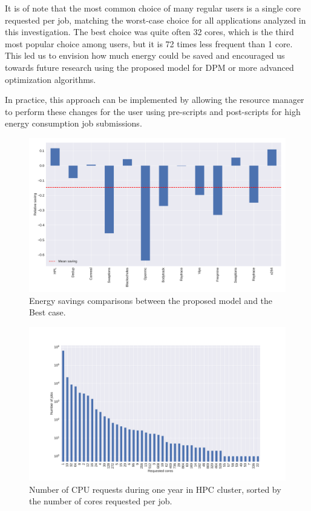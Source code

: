 It is of note that the most common choice of many regular users is a single core requested per job, matching the worst-case choice for all applications analyzed in this investigation. The best choice was quite often 32 cores, which is the third most popular choice among users, but it is 72 times less frequent than 1 core. This led us to envision how much energy could be saved and encouraged us towards future research using the proposed model for DPM or more advanced optimization algorithms.

In practice, this approach can be implemented by allowing the resource manager to perform these changes for the user using pre-scripts and post-scripts for high energy consumption job submissions.
\begin{figure}[H]
	\centering
	\includegraphics[width=\columnwidth]{models/figures/dvfs_cmp_32.pdf}
	\caption{Energy savings comparisons between the proposed model and the Best case.}
	\label{fig:energy_best_case}
\end{figure}
\vspace{-12pt}

\begin{figure}[H]
	\centering
	\includegraphics[width=\columnwidth]{experiments/figures/cpu_requestes.pdf}
	\caption{Number of CPU requests during one year in HPC cluster, sorted by the number of cores requested per job.}
	\label{fig:cpu_requests}
\end{figure}

